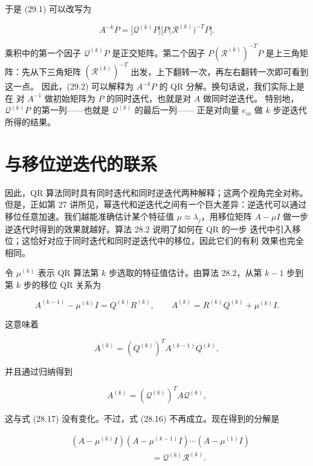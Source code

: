 \documentclass[UTF8,fontset=none,12pt]{ctexart}
\begin{document}
于是 (29.1) 可以改写为

\begin{equation}
A^{-k}P
 =\bigl[\mathcal Q^{(k)}P\bigr]
  \bigl[P\bigl(\mathcal R^{(k)}\bigr)^{-T}P\bigr].
\tag{29.2}
\end{equation}

乘积中的第一个因子 $\mathcal Q^{(k)}P$ 是正交矩阵。第二个因子
$P(\mathcal R^{(k)})^{-T}P$ 是上三角矩阵：先从下三角矩阵
$(\mathcal R^{(k)})^{-T}$ 出发，上下翻转一次，再左右翻转一次即可看到这一点。
因此，(29.2) 可以解释为 $A^{-k}P$ 的 QR 分解。换句话说，我们实际上是在
对 $A^{-1}$ 做初始矩阵为 $P$ 的同时迭代，也就是对 $A$ 做同时逆迭代。
特别地，$\mathcal Q^{(k)}P$ 的第一列——也就是 $\mathcal Q^{(k)}$ 的最后一列——
正是对向量 $e_m$ 做 $k$ 步逆迭代所得的结果。

\section*{与移位逆迭代的联系}

因此，QR 算法同时具有同时迭代和同时逆迭代两种解释；这两个视角完全对称。
但是，正如第 27 讲所见，幂迭代和逆迭代之间有一个巨大差异：逆迭代可以通过
移位任意加速。我们越能准确估计某个特征值 $\mu\approx\lambda_j$，用移位矩阵
$A-\mu I$ 做一步逆迭代时得到的效果就越好。算法 28.2 说明了如何在 QR 的一步
迭代中引入移位；这恰好对应于同时迭代和同时逆迭代中的移位，因此它们的有利
效果也完全相同。

令 $\mu^{(k)}$ 表示 QR 算法第 $k$ 步选取的特征值估计。由算法 28.2，从第
$k-1$ 步到第 $k$ 步的移位 QR 关系为

$$
A^{(k-1)}-\mu^{(k)}I=Q^{(k)}R^{(k)},
\qquad
A^{(k)}=R^{(k)}Q^{(k)}+\mu^{(k)}I.
$$

这意味着

\begin{equation}
A^{(k)}=(Q^{(k)})^TA^{(k-1)}Q^{(k)},
\tag{29.3}
\end{equation}

并且通过归纳得到

$$
A^{(k)}=(\mathcal Q^{(k)})^TA\mathcal Q^{(k)},
$$

这与式 (28.17) 没有变化。不过，式 (28.16) 不再成立。现在得到的分解是

\begin{equation}
\begin{aligned}
&(A-\mu^{(k)}I)(A-\mu^{(k-1)}I)\cdots(A-\mu^{(1)}I)\\
&\hspace{4cm}=\mathcal Q^{(k)}\mathcal R^{(k)}.
\end{aligned}
\tag{29.4}
\end{equation}
\end{document}
